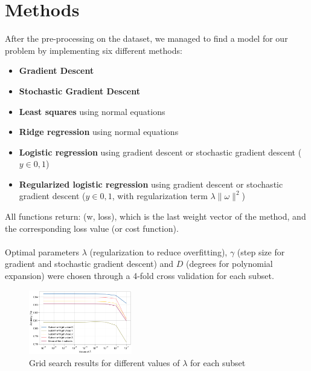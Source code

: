 \documentclass[10pt,conference,compsocconf]{IEEEtran}
\begin{document}
\section{Methods}
After the pre-processing on the dataset, we managed to find a model for our problem by implementing six different methods:
\begin{itemize}
    \item \textbf{Gradient Descent}
    \item \textbf{Stochastic Gradient Descent}
    \item \textbf{Least squares} using normal equations
    \item \textbf{Ridge regression} using normal equations
    \item \textbf{Logistic regression} using gradient descent or stochastic gradient descent ($y \in {0,1}$)
    \item \textbf{Regularized logistic regression} using gradient descent or stochastic gradient descent ($y \in {0,1}$, with regularization term $ \lambda  \| \omega \|^2$)
\end{itemize}
All functions return: (w, loss), which is the last weight vector of the
method, and the corresponding loss value (or cost function).\\
\vspace{0.05cm}\\
Optimal parameters $\lambda$ (regularization to reduce overfitting), $\gamma$ (step size for gradient and stochastic gradient descent) and $D$ (degrees for polynomial expansion) were chosen through a 4-fold cross validation for each subset.
\begin{figure}[h]
    \centering
    \includegraphics[width=0.4\textwidth]{report/lambdas.png}
    \caption{Grid search results for different values of $\lambda$ for each subset}
    \label{fig:lambdas}
\end{figure}\\
\end{document}
